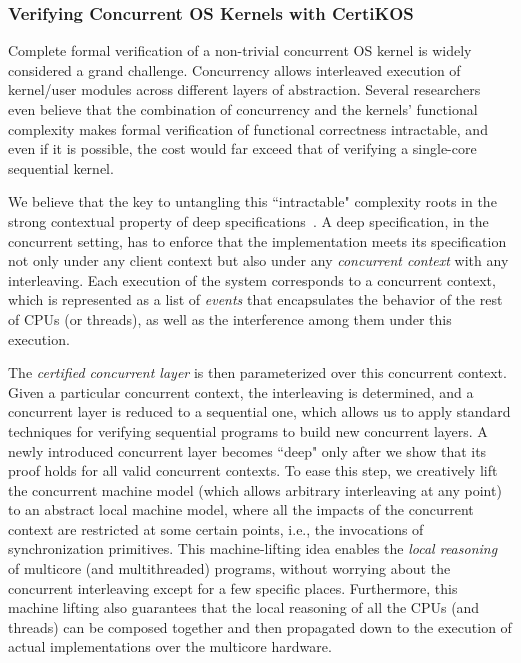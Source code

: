 \documentclass[a4paper, 10pt]{article}
\begin{document}
\begin{small}
\subsubsection*{\small Verifying Concurrent OS Kernels with CertiKOS}
Complete formal verification of a non-trivial concurrent
OS kernel is widely considered a grand challenge. 
Concurrency allows interleaved
execution of kernel/user modules across different
layers of abstraction. 
Several researchers even believe that the combination of concurrency and the kernels’ functional complexity makes formal verification of functional correctness intractable,
and even if it is possible, the cost would far exceed that of
verifying a single-core sequential kernel.

We believe that the key to untangling this ``intractable" complexity roots in the
strong contextual property of deep specifications~\cite{osdi16-gu}.
A deep specification, in the concurrent setting, has to enforce  that
the implementation meets its specification 
not only under any client context but also under
any \emph{concurrent context} with any interleaving.
Each execution of the system corresponds to a  concurrent context, which is represented as a list of \emph{events} that encapsulates the behavior of the rest of CPUs (or threads), as well as the interference
among them under this execution.

The \emph{certified concurrent layer}  is then parameterized over this concurrent context.
Given a particular concurrent context,
the interleaving is determined,
and a concurrent layer is reduced to a sequential one, which allows us to apply standard techniques for
verifying sequential programs to build new concurrent layers.
A newly introduced concurrent layer becomes ``deep" only after we show that its proof holds for all valid concurrent contexts.
To ease this step, we creatively lift the concurrent machine model (which allows arbitrary interleaving at any point) to an abstract local machine model,
where all the impacts of the concurrent context are restricted at
some certain points, i.e.,
the invocations of synchronization primitives. This machine-lifting idea
enables the \emph{local reasoning} of multicore (and multithreaded) programs,
without worrying about the concurrent interleaving except for a few specific places. Furthermore, this machine lifting also guarantees that the local reasoning of all the
CPUs (and threads) can be composed together
and then 
propagated down to the execution of actual 
implementations over the  multicore hardware.


\end{small}
\end{document}

